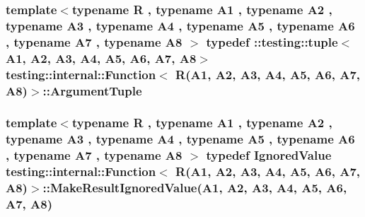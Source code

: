 \subsubsection[{\texorpdfstring{Argument\+Tuple}{ArgumentTuple}}]{\setlength{\rightskip}{0pt plus 5cm}template$<$typename R , typename A1 , typename A2 , typename A3 , typename A4 , typename A5 , typename A6 , typename A7 , typename A8 $>$ typedef \+::testing\+::tuple$<$A1, A2, A3, A4, A5, A6, A7, A8$>$ {\bf testing\+::internal\+::\+Function}$<$ R(A1, A2, A3, A4, A5, A6, A7, A8)$>$\+::{\bf Argument\+Tuple}}\hypertarget{structtesting_1_1internal_1_1Function_3_01R_07A1_00_01A2_00_01A3_00_01A4_00_01A5_00_01A6_00_01A7_00_01A8_08_4_a51df8fdb5ce9de7de4d5f86ba5708a9e}{}\label{structtesting_1_1internal_1_1Function_3_01R_07A1_00_01A2_00_01A3_00_01A4_00_01A5_00_01A6_00_01A7_00_01A8_08_4_a51df8fdb5ce9de7de4d5f86ba5708a9e}
\subsubsection[{\texorpdfstring{Make\+Result\+Ignored\+Value}{MakeResultIgnoredValue}}]{\setlength{\rightskip}{0pt plus 5cm}template$<$typename R , typename A1 , typename A2 , typename A3 , typename A4 , typename A5 , typename A6 , typename A7 , typename A8 $>$ typedef {\bf Ignored\+Value} {\bf testing\+::internal\+::\+Function}$<$ R(A1, A2, A3, A4, A5, A6, A7, A8)$>$\+::Make\+Result\+Ignored\+Value(A1, A2, A3, A4, A5, A6, A7, A8)}\hypertarget{structtesting_1_1internal_1_1Function_3_01R_07A1_00_01A2_00_01A3_00_01A4_00_01A5_00_01A6_00_01A7_00_01A8_08_4_a845b40c19850bfb84cdd778e2fb51b3d}{}\label{structtesting_1_1internal_1_1Function_3_01R_07A1_00_01A2_00_01A3_00_01A4_00_01A5_00_01A6_00_01A7_00_01A8_08_4_a845b40c19850bfb84cdd778e2fb51b3d}
